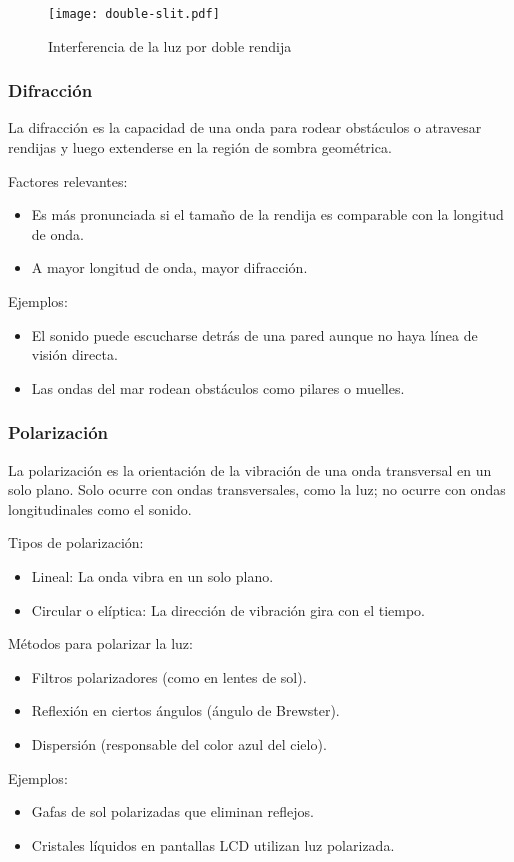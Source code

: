 \begin{figure}[ht]
  \centering
  \texttt{[image: double-slit.pdf]}
  \caption{Interferencia de la luz por doble rendija}
  \label{fig:double_slit}
\end{figure}

\subsubsection{Difracción}

La difracción es la capacidad de una onda para rodear obstáculos o atravesar rendijas y luego extenderse en la región de sombra geométrica.

Factores relevantes:

\begin{itemize}
  \item Es más pronunciada si el tamaño de la rendija es comparable con la longitud de onda.
  \item A mayor longitud de onda, mayor difracción.
\end{itemize}

Ejemplos:

\begin{itemize}
  \item El sonido puede escucharse detrás de una pared aunque no haya línea de visión directa.
  \item Las ondas del mar rodean obstáculos como pilares o muelles.
\end{itemize}

\subsubsection{Polarización}

La polarización es la orientación de la vibración de una onda transversal en un solo plano. Solo ocurre con ondas transversales, como la luz; no ocurre con ondas longitudinales como el sonido.

Tipos de polarización:

\begin{itemize}
  \item Lineal: La onda vibra en un solo plano.
  \item Circular o elíptica: La dirección de vibración gira con el tiempo.
\end{itemize}

Métodos para polarizar la luz:

\begin{itemize}
  \item Filtros polarizadores (como en lentes de sol).
  \item Reflexión en ciertos ángulos (ángulo de Brewster).
  \item Dispersión (responsable del color azul del cielo).
\end{itemize}

Ejemplos:

\begin{itemize}
  \item Gafas de sol polarizadas que eliminan reflejos.
  \item Cristales líquidos en pantallas LCD utilizan luz polarizada.
\end{itemize}

